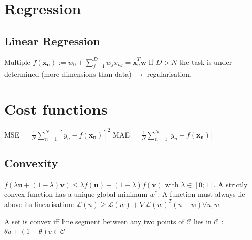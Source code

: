 \section{Regression}
\subsection{Linear Regression}
Multiple\newline
$f(\mathbf{x_n}) := w_0 + \sum_{j=1}^D w_j x_{nj} = \tilde{\mathbf{x}}_n^T \mathbf{w}$\newline
If $D > N$ the task is under-determined (more dimensions than data) $\rightarrow$ regularisation.

\section{Cost functions}
MSE $= \frac{1}{N} \sum_{n=1}^N [y_n - f(\mathbf{x_n})]^2$ \newline
MAE $= \frac{1}{N} \sum_{n=1}^N |y_n - f(\mathbf{x_n})|$\newline
\subsection{Convexity}
$f(\lambda \mathbf{u} + (1-\lambda)\mathbf{v}) \le \lambda f(\mathbf{u}) + (1-\lambda) f(\mathbf{v})$ with $\lambda \in [0;1]$.
A strictly convex function has a unique global minimum $w^*$. 
A function must always lie above its linearisation: \newline $\mathcal{L}(u) \ge \mathcal{L}(w) + \nabla \mathcal{L}(w)^T (u-w) \forall u,w$.

A set is convex iff line segment between any two points of $\mathcal{C}$ lies in $\mathcal{C}$ : $\theta u + (1 - \theta) v \in \mathcal{C}$

